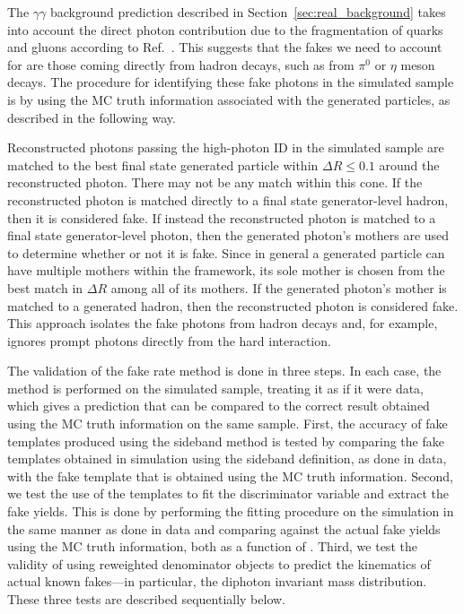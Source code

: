 The \SHERPA $\gamma\gamma$ background prediction described in Section~\ref{sec:real_background} takes into account the direct photon contribution due to the fragmentation of quarks and gluons according to Ref.~\cite{Hoeche:2009xc}. This suggests that the fakes we need to account for are those coming directly from hadron decays, such as from $\pi^0$ or $\eta$ meson decays. The procedure for identifying these fake photons in the simulated sample is by using the MC truth information associated with the generated particles, as described in the following way.

Reconstructed photons passing the high-\pt photon ID in the simulated sample are matched to the best final state generated particle within $\Delta R \le 0.1$ around the reconstructed photon. There may not be any match within this cone. If the reconstructed photon is matched directly to a final state generator-level hadron, then it is considered fake. If instead the reconstructed photon is matched to a final state generator-level photon, then the generated photon's mothers are used to determine whether or not it is fake. Since in general a generated particle can have multiple mothers within the \SHERPA framework, its sole mother is chosen from the best match in $\Delta R$ among all of its mothers. If the generated photon's mother is matched to a generated hadron, then the reconstructed photon is considered fake. This approach isolates the fake photons from hadron decays and, for example, ignores prompt photons directly from the hard interaction.

The validation of the fake rate method is done in three steps. In each case, the method is performed on the simulated sample, treating it as if it were data, which gives a prediction that can be compared to the correct result obtained using the MC truth information on the same sample. First, the accuracy of fake templates produced using the sideband method is tested by comparing the fake templates obtained in simulation using the sideband definition, as done in data, with the fake template that is obtained using the MC truth information. Second, we test the use of the templates to fit the discriminator variable and extract the fake yields. This is done by performing the fitting procedure on the simulation in the same manner as done in data and comparing against the actual fake yields using the MC truth information, both as a function of \pt. Third, we test the validity of using reweighted denominator objects to predict the kinematics of actual known fakes---in particular, the diphoton invariant mass distribution. These three tests are described sequentially below.


